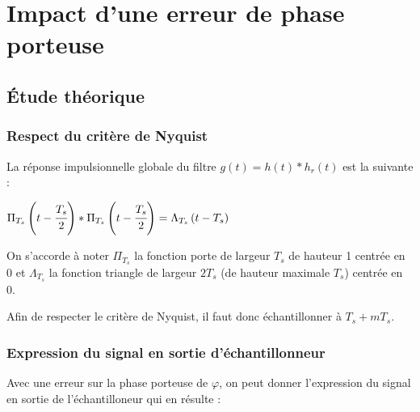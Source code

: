 \documentclass[11pt,a4paper]{report}
\begin{document}
\part{Impact d'une erreur de phase porteuse}

\chapter{Étude théorique}


\section{Respect du critère de Nyquist}

La réponse impulsionnelle globale du filtre $g(t) = h(t) \ast h_r(t)$ est la suivante :

\begin{center}
    $\Pi_{T_s}\displaystyle\left(t - \cfrac{T_s}{2}\right) \ast \Pi_{T_s}\displaystyle\left(t - \cfrac{T_s}{2}\right) = \Lambda_{T_s}\displaystyle\left(t - T_s\right)$
\end{center}

\begin{tcolorbox}[colback=blue!5!white,
                  colframe=blue!75!black,
                  title=Notations
                 ]
On s'accorde à noter $\Pi_{T_s}$ la fonction porte de largeur $T_s$ de hauteur 1 centrée en 0 et $\Lambda_{T_s}$ la fonction triangle de largeur $2T_s$ (de hauteur maximale $T_s$) centrée en 0.
\end{tcolorbox}
Afin de respecter le critère de Nyquist, il faut donc échantillonner à $T_s + mT_s$.

\newpage

\vspace{0.5cm}

\section{Expression du signal en sortie d'échantillonneur}

Avec une erreur sur la phase porteuse de $\varphi$, on peut donner l'expression du signal en sortie de l'échantilloneur qui en résulte :
\end{document}
